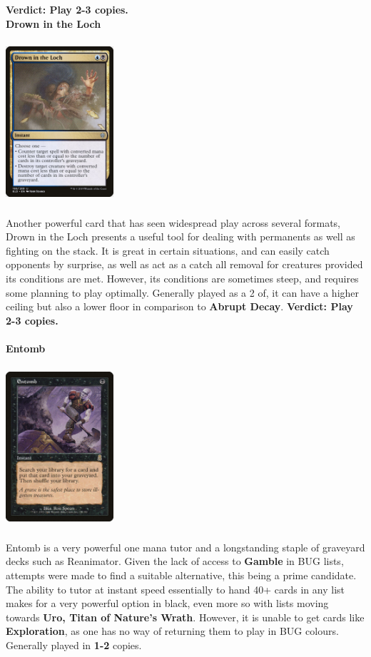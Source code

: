 \documentclass{report}
\begin{document}
\textbf{Verdict: Play 2-3 copies.\\}
\newpage
\textbf{Drown in the Loch}
\begin{center}
\includegraphics [width = 4cm, height = 6cm] {drown-in-the-loch}
\end{center}
Another powerful card that has seen widespread play across several formats, Drown in the Loch presents a useful tool for dealing with permanents as well as fighting on the stack. It is great in certain situations, and can easily catch opponents by surprise, as well as act as a catch all removal for creatures provided its conditions are met. However, its conditions are sometimes steep, and requires some planning to play optimally. Generally played as a 2 of, it can have a higher ceiling but also a lower floor in comparison to \textbf{Abrupt Decay}.
\textbf{Verdict: Play 2-3 copies.\\}\\
\textbf{Entomb\\}
\begin{center}
\includegraphics [width = 4cm, height = 6cm] {entomb}
\end{center}
Entomb is a very powerful one mana tutor and a longstanding staple of graveyard decks such as Reanimator. Given the lack of access to \textbf{Gamble} in BUG lists, attempts were made to find a suitable alternative, this being a prime candidate. The ability to tutor at instant speed essentially to hand 40+ cards in any list makes for a very powerful option in black, even more so with lists moving towards \textbf{Uro, Titan of Nature's Wrath}. However, it is unable to get cards like \textbf{Exploration}, as one has no way of returning them to play in BUG colours. Generally played in \textbf{1-2} copies.\\\\
\end{document}
